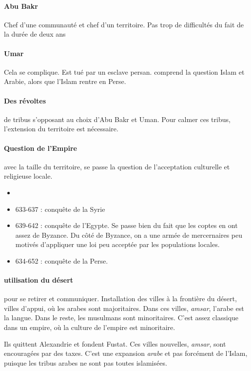 \paragraph{Abu Bakr} Chef d'une communauté et chef d'un territoire. Pas trop de difficultés du fait de la durée de deux ans

\paragraph{Umar} Cela se complique. Est tué par un esclave persan. comprend la question Islam et Arabie, alors que l'Islam rentre en Perse.  

\paragraph{Des révoltes} de tribus s'opposant au choix d'Abu Bakr et Uman. Pour calmer ces tribus, l'extension du territoire est nécessaire.

\paragraph{Question de l'Empire} avec la taille du territoire, se passe la question de l'acceptation culturelle et religieuse locale.
\begin{itemize}
    \item \item 	633-637 : conquête de la Syrie
\item 	639-642 : conquête de l’Egypte. Se passe bien du fait que les coptes en ont assez de Byzance. Du côté de Byzance, on a une armée de mercernaires peu motivés d'appliquer une loi peu acceptée par les populations locales. 
\item 	634-652 : conquête de la Perse. 

\end{itemize}

\paragraph{utilisation du désert} pour se retirer et communiquer. Installation des villes à la frontière du désert, villes d'appui, où les arabes sont majoritaires. Dans ces villes, \textit{amsar}, l'arabe est la langue. Dans le reste, les musulmans sont minoritaires.   
C'est assez classique dans un empire, où la culture de l'empire est minoritaire.

\begin{Ex}[Fustat]
Ils quittent Alexandrie et fondent Fustat.  Ces villes nouvelles, \textit{amsar}, sont encouragées par des taxes. C'est une expansion \textit{arabe} et pas forcément de l'Islam, puisque les tribus arabes ne sont pas toutes islamisées.
\end{Ex}

